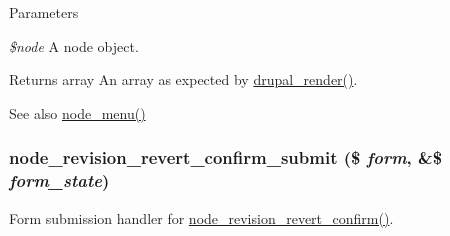 \begin{DoxyParams}{Parameters}
\item[{\em \$node}]A node object.\end{DoxyParams}
\begin{DoxyReturn}{Returns}
array An array as expected by \hyperlink{common_8inc_a05798b44e8d6c496d4bee5cc32fa7851}{drupal\_\-render()}.
\end{DoxyReturn}
\begin{DoxySeeAlso}{See also}
\hyperlink{node_8module_a15e8d85a7559f22b8f2c77c1d5dfac63}{node\_\-menu()} 
\end{DoxySeeAlso}
\hypertarget{node_8pages_8inc_ae22f280976210711cb3bd363caa6d956}{
\subsubsection[{node\_\-revision\_\-revert\_\-confirm\_\-submit}]{\setlength{\rightskip}{0pt plus 5cm}node\_\-revision\_\-revert\_\-confirm\_\-submit (\$ {\em form}, \/  \&\$ {\em form\_\-state})}}
\label{node_8pages_8inc_ae22f280976210711cb3bd363caa6d956}
Form submission handler for \hyperlink{group__forms_ga755acf87a0cd1c4d9d457843656c397b}{node\_\-revision\_\-revert\_\-confirm()}. 
